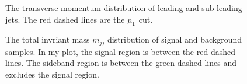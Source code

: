 \documentclass[12pt]{article}
\begin{document}
		\begin{figure}[htpb]
			\centering
			\caption{The transverse momentum distribution of leading and sub-leading jets. The red dashed lines are the $p_{\text{T}}$ cut.}
			\label{fig:HVmodel_pt_distribution}
		\end{figure}

		\begin{figure}[htpb]
			\centering
			
			\caption{The total invriant mass $m_{jj}$ distribution of signal and background samples. In my plot, the signal region is between the red dashed lines. The sideband region is between the green dashed lines and excludes the signal region.}
			\label{fig:HVmodel_mjj_distribution}
		\end{figure}
\end{document}
